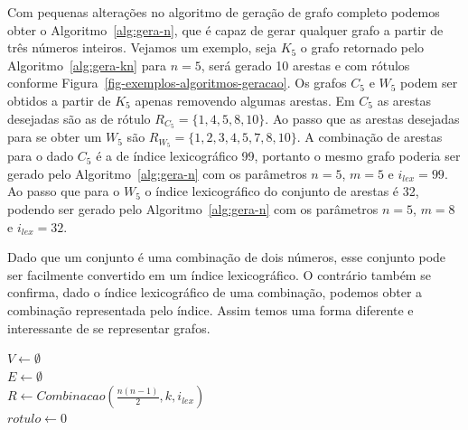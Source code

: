 Com pequenas alterações no algoritmo de geração de grafo completo podemos obter o Algoritmo~\ref{alg:gera-n}, que é capaz de gerar qualquer grafo a partir de três números inteiros. Vejamos um exemplo, seja $K_5$ o grafo retornado pelo Algoritmo~\ref{alg:gera-kn} para $n=5$, será gerado 10 arestas e com rótulos conforme Figura~\ref{fig-exemplos-algoritmos-geracao}. Os grafos $C_5$ e $W_5$ podem ser obtidos a partir de $K_5$ apenas removendo algumas arestas. Em $C_5$ as arestas desejadas são as de rótulo $R_{C_5}=\{1, 4, 5, 8, 10\}$. Ao passo que as arestas desejadas para se obter um $W_5$ são $R_{W_5}=\{1, 2, 3, 4, 5, 7, 8, 10\}$. A combinação de arestas para o dado $C_5$ é a de índice lexicográfico 99, portanto o mesmo grafo poderia ser gerado pelo Algoritmo~\ref{alg:gera-n} com os parâmetros $n=5$, $m=5$ e $i_{lex}=99$. Ao passo que para o $W_5$ o índice lexicográfico do conjunto de arestas é 32, podendo ser gerado pelo Algoritmo~\ref{alg:gera-n} com os parâmetros $n=5$, $m=8$ e $i_{lex}=32$.

Dado que um conjunto é uma combinação de dois números, esse conjunto pode ser facilmente convertido em um índice lexicográfico. O contrário também se confirma, dado o índice lexicográfico de uma combinação, podemos obter a combinação representada pelo índice. Assim temos uma forma diferente e interessante de se representar grafos.


\begin{algorithm2e}[H]
    \SetAlFnt{\tiny}
    \SetAlCapFnt{\small}
    \SetAlCapNameFnt{\small}
    \SetAlgoLined
    \DontPrintSemicolon
    \LinesNumbered
    \SetAlgoLined
    \BlankLine
    \BlankLine
    $V \gets \emptyset$ \\
    $E \gets \emptyset$ \\
    $R \gets Combinacao(\frac{n(n-1)}{2},k,i_{lex})$\\
    $rotulo \gets 0$ \\
\caption{$GeraG(n,m,i_{lex})$}
\label{alg:gera-n}
\end{algorithm2e} 


